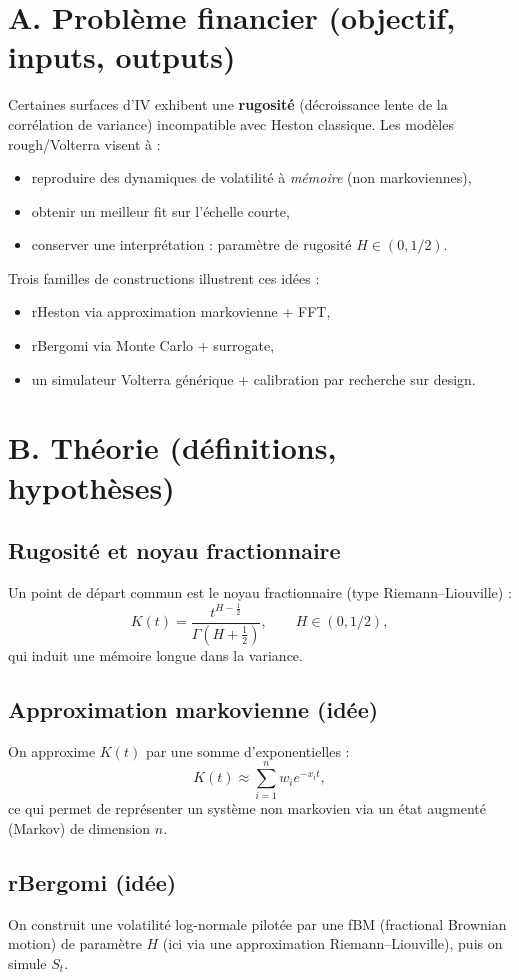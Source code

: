 \documentclass[11pt,a4paper]{report}
\theoremstyle{definition}
\theoremstyle{plain}
\theoremstyle{remark}
\newcommand{\1}{\mathbf{1}}
\begin{document}
\section{A. Problème financier (objectif, inputs, outputs)}
Certaines surfaces d'IV exhibent une \textbf{rugosité} (décroissance lente de la corrélation de variance) incompatible avec Heston classique. Les modèles rough/Volterra visent à :
\begin{itemize}[leftmargin=*]
\item reproduire des dynamiques de volatilité à \emph{mémoire} (non markoviennes),
\item obtenir un meilleur fit sur l'échelle courte,
\item conserver une interprétation : paramètre de rugosité $H\in(0,1/2)$.
\end{itemize}

Trois familles de constructions illustrent ces idées :
\begin{itemize}[leftmargin=*]
\item rHeston via approximation markovienne + FFT,
\item rBergomi via Monte Carlo + surrogate,
\item un simulateur Volterra générique + calibration par recherche sur design.
\end{itemize}

\section{B. Théorie (définitions, hypothèses)}
\subsection*{Rugosité et noyau fractionnaire}
Un point de départ commun est le noyau fractionnaire (type Riemann--Liouville) :
\[
K(t)=\frac{t^{H-\frac12}}{\Gamma(H+\frac12)},\qquad H\in(0,1/2),
\]
qui induit une mémoire longue dans la variance.

\subsection*{Approximation markovienne (idée)}
On approxime $K(t)$ par une somme d'exponentielles :
\[
K(t)\approx \sum_{i=1}^{n} w_i e^{-x_i t},
\]
ce qui permet de représenter un système non markovien via un état augmenté (Markov) de dimension $n$.

\subsection*{rBergomi (idée)}
On construit une volatilité log-normale pilotée par une fBM (fractional Brownian motion) de paramètre $H$ (ici via une approximation Riemann--Liouville), puis on simule $S_t$.
\end{document}
